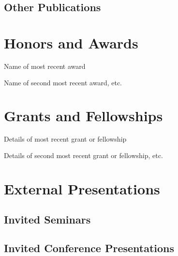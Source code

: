\documentclass[12pt]{article}%
\begin{document}
\subsection*{Other Publications}
\hfill
\section*{Honors and Awards}
\begin{description}[noitemsep]
\item[year] Name of most recent award
\item[year] Name of second most recent award, etc.
\end{description}

\section*{Grants and Fellowships}
\begin{description}[noitemsep]
\item[year] Details of most recent grant or fellowship
\item[year] Details of second most recent grant or fellowship, etc.
\end{description}

\section*{External Presentations}

\subsection*{Invited Seminars}
\subsection*{Invited Conference Presentations}
\end{document}
